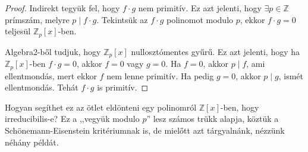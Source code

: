 \documentclass[12pt]{book}
\theoremstyle{plain} %
\theoremstyle{definition} %
\theoremstyle{remark}
\numberwithin{equation}{section}  %
\begin{document}
	\begin{proof}
		Indirekt tegyük fel, hogy $f\cdot g$ nem primitív. Ez azt jelenti, hogy $\exists p\in \mathbb{Z}$ prímszám, melyre $p\mid f\cdot g$. Tekintsük az $f\cdot g$ polinomot modulo $p$, ekkor $f\cdot g = 0$ teljesül $\mathbb{Z}_p[x]$-ben.
		
		Algebra2-ből tudjuk, hogy $\mathbb{Z}_p[x]$ nullosztómentes gyűrű. Ez azt jelenti, hogy ha $\mathbb{Z}_p[x]$-ben $f\cdot g = 0$, akkor $f=0$ vagy $g=0$. Ha $f=0$, akkor $p \mid f$, ami ellentmondás, mert ekkor $f$ nem lenne primitív. Ha pedig $g=0$, akkor $p\mid g$, ismét ellentmondás. Tehát $f\cdot g$ is primitív.
	\end{proof}
	Hogyan segíthet ez az ötlet eldönteni egy polinomról $\mathbb{Z}[x]$-ben, hogy irreducibilis-e? Ez a ,,vegyük modulo $p$'' lesz számos trükk alapja, köztük a Schönemann-Eisenstein kritériumnak is, de mielőtt azt tárgyalnánk, nézzünk néhány példát.
\end{document}
